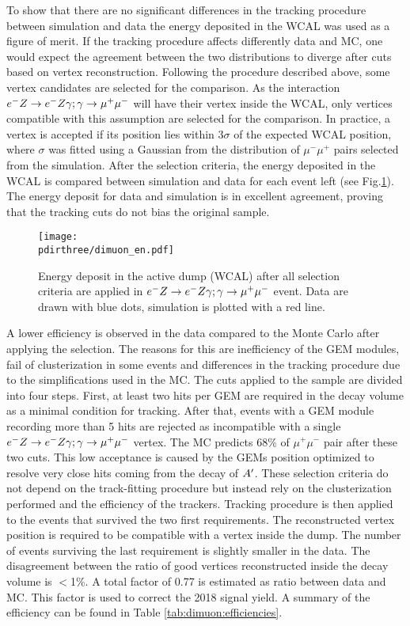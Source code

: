 To show that there are no significant differences in the tracking procedure between simulation and data the energy deposited in the WCAL was used as a figure of merit. If the tracking procedure affects differently data and MC, one would expect the agreement between the two distributions to diverge after cuts based on vertex reconstruction. Following the procedure described above, some vertex candidates are selected for the comparison. As the interaction $\emu$ will have their vertex inside the WCAL, only vertices compatible with this assumption are selected for the comparison. In practice, a vertex is accepted if its position lies within 3$\sigma$ of the expected WCAL position, where $\sigma$ was fitted using a Gaussian from the distribution of $\mu^- \mu^+$ pairs selected from the simulation. After the selection criteria, the energy deposited in the WCAL is compared between simulation and data for each event left (see Fig.\ref{fig:dimuon_en}). The energy deposit for data and simulation is in excellent agreement, proving that the tracking cuts do not bias the original sample.

\begin{figure}[tbh!]
  \centering
    \texttt{[image: \\pdirthree/dimuon\_en.pdf]}
  \caption[$\emu$ MC-DATA comparison in visible mode]{Energy deposit in the active dump (WCAL) after all selection criteria are applied in $\emu$ event. Data are drawn with blue dots, simulation is plotted with a red line.}
  \label{fig:dimuon_en}
\end{figure}

A lower efficiency is observed in the data compared to the Monte Carlo after applying the selection. The reasons for this are inefficiency of the GEM modules, fail of clusterization in some events and differences in the tracking procedure due to the simplifications used in the MC. The cuts applied to the sample are divided into four steps. First, at least two hits per GEM are required in the decay volume as a minimal condition for tracking. After that, events with a GEM module recording more than 5 hits are rejected as incompatible with a single $\emu$ vertex. The MC predicts 68\% of $\mu^+ \mu^-$ pair after these two cuts. This low acceptance is caused by the GEMs position optimized to resolve very close hits coming from the decay of $A'$. These selection criteria do not depend on the track-fitting procedure but instead rely on the clusterization performed and the efficiency of the trackers. Tracking procedure is then applied to the events that survived the two first requirements. The reconstructed vertex position is required to be compatible with a vertex inside the dump. The number of events surviving the last requirement  is slightly smaller in the data. The disagreement between the ratio of good vertices reconstructed inside the decay volume is $<$1\%. A total factor of 0.77 is estimated as ratio between data and MC. This factor is used to correct the 2018 signal yield. A summary of the efficiency can be found in Table \ref{tab:dimuon:efficiencies}.

